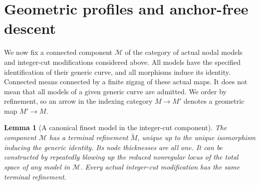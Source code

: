 \documentclass[11pt]{article}
\newtheorem{lemma}[theorem]{Lemma}
\theoremstyle{definition}
\theoremstyle{remark}
\begin{document}
\section{Geometric profiles and anchor-free descent}
\label{sec:profiles}
We now fix a connected component $\mathscr M$ of the category of
actual nodal models and integer-cut modifications considered above.
All models have the specified identification of their generic curve,
and all morphisms induce its identity.  Connected means connected by
a finite zigzag of these actual maps.  It does not mean that all models
of a given generic curve are admitted.  We order by refinement, so
an arrow in the indexing category $M\to M'$ denotes a geometric map
$M'\to M$.

\begin{lemma}[A canonical finest model in the integer-cut component]
\label{lem:finest-model}
The component $\mathscr M$ has a terminal refinement $\widetilde M$,
unique up to the unique isomorphism inducing the generic identity.
Its node thicknesses are all one.  It can be constructed by repeatedly
blowing up the reduced nonregular locus of the total space of any
model in $\mathscr M$.  Every actual integer-cut modification has
the same terminal refinement.
\end{lemma}
\end{document}
